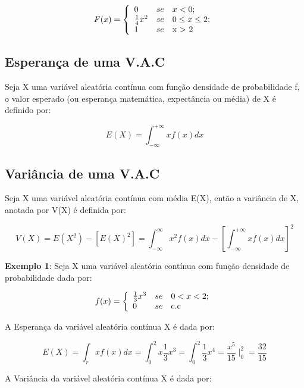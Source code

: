 $$
F(x)=
\left\{%
\begin{array}{ll}
    0                 & se \quad \hbox{$x < 0$;} \\
   \frac{1}{4}x^{2}   & se \quad \hbox{$0 \leq x \leq 2$;} \\
   1                  & se \quad \hbox{x > 2} \\
\end{array}%
\right.
$$


\subsection{Esperança de uma V.A.C}

Seja X uma variável aleatória contínua com função densidade de
probabilidade f, o valor esperado (ou esperança matemática,
expectância ou média) de X é definido por:


\begin{equation}\label{}
    E(X)=\int_{-\infty}^{+\infty}xf(x)dx
\end{equation}

\newpage
\subsection{Variância de uma V.A.C}

Seja X uma variável aleatória contínua com média E(X), então a
variância de X, anotada por V(X) é definida por:


\begin{equation}\label{}
V(X) = E(X^{2})-[E(X)^{2}]= \int_{-\infty}^{\infty}x^{2}f(x)dx
-\left[\int_{-\infty}^{+\infty}xf(x)dx\right]^{2}
\end{equation}


\textbf{Exemplo 1}: Seja X uma variável aleatória contínua com
função densidade de probabilidade dada por:

$$
f(x)=
\left\{%
\begin{array}{ll}
   \frac{1}{3}x^{3}   & se \quad \hbox{$0 < x < 2$;} \\
   0                  & se \quad \hbox{c.c} \\
\end{array}%
\right.
$$

A Esperança da variável aleatória contínua X é dada por:

$$
E(X)= \int_{r} xf(x)dx = \int^{2}_{0}x\frac{1}{3}x^{3} =
\int^{2}_{0}\frac{1}{3}x^{4} = \frac{x^{5}}{15}\mid^{2}_{0}=
\frac{32}{15}
$$

A Variância da variável aleatória contínua X é dada por:

